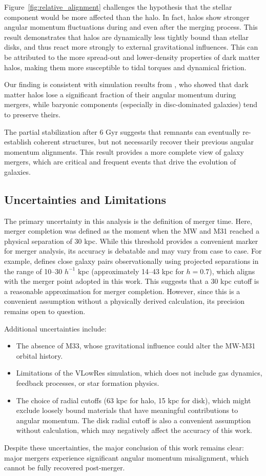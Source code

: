 \documentclass[twocolumn]{aastex631}
\begin{document}
Figure~\ref{fig:relative_alignment} challenges the hypothesis that the stellar component would be more affected than the halo. In fact, halos show stronger angular momentum fluctuations during and even after the merging process. This result demonstrates that halos are dynamically less tightly bound than stellar disks, and thus react more strongly to external gravitational influences. This can be attributed to the more spread-out and lower-density properties of dark matter halos, making them more susceptible to tidal torques and dynamical friction.

Our finding is consistent with simulation results from \cite{Zavala2008}, who showed that dark matter halos lose a significant fraction of their angular momentum during mergers, while baryonic components (especially in disc-dominated galaxies) tend to preserve theirs.


The partial stabilization after 6 Gyr suggests that remnants can eventually re-establish coherent structures, but not necessarily recover their previous angular momentum alignments. This result provides a more complete view of galaxy mergers, which are critical and frequent events that drive the evolution of galaxies.


\subsection{Uncertainties and Limitations}

The primary uncertainty in this analysis is the definition of merger time. Here, merger completion was defined as the moment when the MW and M31 reached a physical separation of 30 kpc. While this threshold provides a convenient marker for merger analysis, its accuracy is debatable and may vary from case to case. For example, \cite{Lotz2011} defines close galaxy pairs observationally using projected separations in the range of 10–30 $h^{-1}$ kpc (approximately 14–43 kpc for $h = 0.7$), which aligns with the merger point adopted in this work. This suggests that a 30 kpc cutoff is a reasonable approximation for merger completion. However, since this is a convenient assumption without a physically derived calculation, its precision remains open to question.


Additional uncertainties include:
\begin{itemize}
    \item The absence of M33, whose gravitational influence could alter the MW-M31 orbital history.
    \item Limitations of the VLowRes simulation, which does not include gas dynamics, feedback processes, or star formation physics.
    \item The choice of radial cutoffs (63 kpc for halo, 15 kpc for disk), which might exclude loosely bound materials that have meaningful contributions to angular momentum. The disk radial cutoff is also a convenient assumption without calculation, which may negatively affect the accuracy of this work. 
\end{itemize}

Despite these uncertainties, the major conclusion of this work remains clear: major mergers experience significant angular momentum misalignment, which cannot be fully recovered post-merger.



\end{document}
